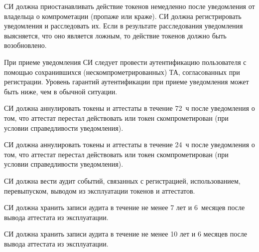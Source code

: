 


СИ должна приостанавливать действие токенов немедленно после 
уведомления от владельца о компрометации (пропаже или краже).
%
СИ должна регистрировать уведомления и расследовать их.
%
Если в результате расследования уведомления выясняется, что оно является 
ложным, то действие токенов должно быть возобновлено.

\begin{note*}
При приеме уведомления СИ следует провести аутентификацию пользователя
с помощью сохранившихся (нескомпрометрированных) ТА, согласованных при 
регистрации. 
%
Уровень гарантий аутентификации при приеме уведомления может быть ниже, 
чем в обычной ситуации.
\end{note*}


СИ должна аннулировать токены и аттестаты в течение 72~ч 
после уведомления о том, что аттестат перестал действовать 
или токен скомпрометирован (при условии справедливости уведомления).

СИ должна аннулировать токены и аттестаты в течение 24~ч
после уведомления о том, что аттестат перестал действовать 
или токен скомпрометирован (при условии справедливости уведомления). 

СИ должна вести аудит событий, связанных с регистрацией, использованием, 
перевыпуском, выводом из эксплуатации токенов и аттестатов.  


СИ должна хранить записи аудита в течение не менее 7 лет и 6~месяцев после 
вывода аттестата из эксплуатации.  

СИ должна хранить записи аудита в течение не менее 10 лет и 6 месяцев 
после вывода аттестата из эксплуатации.  
